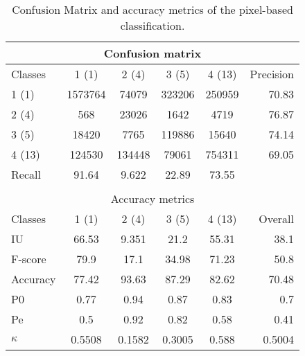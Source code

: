 \begin{table}[H]
\begin{center}
\footnotesize
\begin{tabular}{|l|c|c|c|c|r|}
\hline
\multicolumn{6}{|c|}{Confusion matrix} \\
\hline
 Classes & 1 (1) & 2 (4) & 3 (5) & 4 (13) & Precision \\
\hline
1 (1) & 1573764 & 74079 & 323206 & 250959 & 70.83 \\
\hline
2 (4) & 568 & 23026 & 1642 & 4719 & 76.87 \\
\hline
3 (5) & 18420 & 7765 & 119886 & 15640 & 74.14 \\
\hline
4 (13) & 124530 & 134448 & 79061 & 754311 & 69.05 \\
\hline
Recall & 91.64 & 9.622 & 22.89 & 73.55 &  \\
\hline
\multicolumn{6}{c}{ } \\
\hline
\multicolumn{6}{|c|}{Accuracy metrics} \\
\hline
 Classes & 1 (1) & 2 (4) & 3 (5) & 4 (13) & Overall \\
\hline
IU & 66.53 & 9.351 & 21.2 & 55.31 & 38.1 \\
\hline
F-score & 79.9 & 17.1 & 34.98 & 71.23 & 50.8 \\
\hline
Accuracy & 77.42 & 93.63 & 87.29 & 82.62 & 70.48 \\
\hline
P0 & 0.77 & 0.94 & 0.87 & 0.83 & 0.7 \\
\hline
Pe & 0.5 & 0.92 & 0.82 & 0.58 & 0.41 \\
\hline
$\kappa$ & 0.5508 & 0.1582 & 0.3005 & 0.588 & 0.5004 \\
\hline
\end{tabular}
\caption{Confusion Matrix and accuracy metrics of the pixel-based classification.}
\label{table:C3_S3_ss3_classif_pixel}
\end{center}
\end{table}